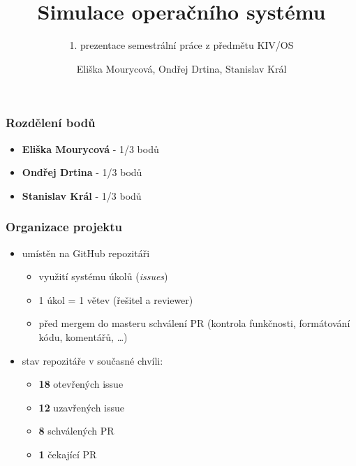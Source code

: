\documentclass[xcolor=dvipsnames]{beamer}
\title[1. prezentace SP] %
{Simulace operačního systému}
\subtitle{1. prezentace semestrální práce z předmětu KIV/OS}
\institute[ZČU FAV] %
{
    Západočeská univerzita v Plzni
    \and
    Fakulta aplikovaných věd
}
\author[Eliška, Ondřej, Stanislav] %
{Eliška Mourycová, Ondřej Drtina, Stanislav Král}
\begin{document}
\begin{frame}
  \titlepage
\end{frame}

\begin{frame}
\frametitle{Rozdělení bodů}
	\begin{itemize}
        \item \textbf{Eliška Mourycová} - 1/3 bodů
        \item \textbf{Ondřej Drtina} - 1/3 bodů
        \item \textbf{Stanislav Král} - 1/3 bodů
  	\end{itemize}
\end{frame}

\begin{frame}
\frametitle{Organizace projektu}
	\begin{itemize}
        \item umístěn na GitHub repozitáři
            \begin{itemize}
                \item využití systému úkolů (\textit{issues})
                \item 1 úkol = 1 větev (řešitel a reviewer)
                \item před mergem do masteru schválení PR (kontrola funkčnosti, formátování kódu, komentářů, \ldots)
            \end{itemize}
            \item stav repozitáře v současné chvíli:
            \begin{itemize}
                \item \textbf{18} otevřených issue 
                \item \textbf{12} uzavřených issue
                \item \textbf{8} schválených PR
                \item \textbf{1} čekající PR
            \end{itemize}
  	\end{itemize}
\end{frame}
\end{document}
